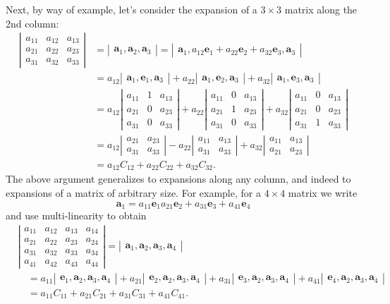 \documentclass[12pt]{article}
\newcommand{\ba}{\mathbf{a}}
\newcommand{\be}{\mathbf{e}}
\newcommand{\vmat}[1]{\left|\begin{matrix}#1\end{matrix}\right|}
\begin{document}
Next, by way of example, let's consider the expansion of a $3\times 3$
matrix along the 2nd column:
\begin{align*}
\vmat{ a_{11}&a_{12}& a_{13} \\
    a_{21}&a_{22} & a_{23} \\
    a_{31}&a_{32} & a_{33}}
  &= \vmat{ \ba_1, \ba_2, \ba_3}  = \vmat{\ba_1, a_{12} \be_1+ a_{22}
    \be_2 + a_{32} \be_3, \ba_3}  \\
  &= a_{12} \vmat{\ba_1, \be_1,
    \ba_3} + a_{22} \vmat{\ba_1, \be_2, \ba_3} +a_{32}
  \vmat{\ba_1,\be_3,\ba_3} \\
  &= a_{12}
  \vmat{ a_{11}&1& a_{13} \\
    a_{21}&0 & a_{23} \\
    a_{31}&0 & a_{33}} + a_{22}
  \vmat{ a_{11}&0& a_{13} \\
    a_{21}&1 & a_{23} \\
    a_{31}&0 & a_{33}} + a_{32}
  \vmat{ a_{11}&0& a_{13} \\
    a_{21}&0 & a_{23} \\
    a_{31}&1 & a_{33}}\\
  &= a_{12} \vmat{ a_{21} & a_{23} \\ a_{31} & a_{33}}
  - a_{22} \vmat{a_{11} & a_{13} \\ a_{31} & a_{33}} 
  + a_{32} \vmat{a_{11} & a_{13} \\ a_{21} &a_{23}} \\
  &= a_{12} C_{12} + a_{22} C_{22} + a_{32} C_{32}.
\end{align*}
The above argument generalizes to expansions along any column, and
indeed to expansions of a matrix of arbitrary size.  
For
example, for a $4\times 4$ matrix we write
\[\ba_1 = a_{11}\be_1 a_{21}  \be_2 + a_{31} \be_3 + a_{41} \be_4\]
and use multi-linearity to obtain
\begin{align*}
&\vmat{ a_{11}&a_{12}& a_{13} & a_{14} \\
    a_{21}&a_{22} & a_{23} & a_{24} \\
    a_{31}&a_{32} & a_{33} & a_{34} \\
  a_{41} & a_{42} & a_{43} & a_{44}}
  = \vmat{ \ba_1, \ba_2, \ba_3,\ba_4} \\
 &\quad = a_{11} \vmat{\be_1, \ba_2,
    \ba_3,\ba_4} + a_{21} \vmat{\be_2, \ba_2, \ba_3,\ba_4} +a_{31}
  \vmat{\be_3,\ba_2,\ba_3,\ba_4}+a_{41} \vmat{\be_4,\ba_2, \ba_3, \ba_4} \\
  & \quad = a_{11} C_{11} + a_{21} C_{21} + a_{31} C_{31}+a_{41} C_{41}.
\end{align*}
\end{document}
